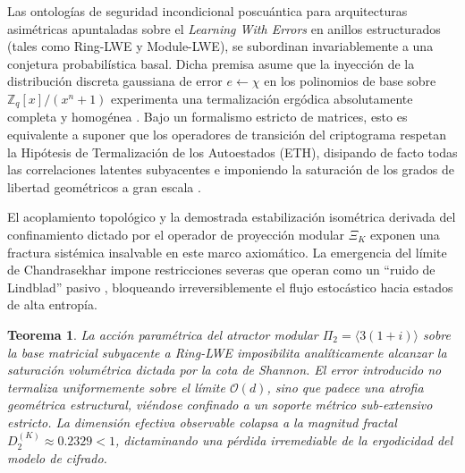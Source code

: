 \documentclass{article}
\numberwithin{equation}{section}
\theoremstyle{plain}
\newtheorem{teorema}{Teorema}[section]
\theoremstyle{definition}
\begin{document}
Las ontologías de seguridad incondicional poscuántica para arquitecturas asimétricas apuntaladas sobre el \textit{Learning With Errors} en anillos estructurados (tales como Ring-LWE y Module-LWE), se subordinan invariablemente a una conjetura probabilística basal. Dicha premisa asume que la inyección de la distribución discreta gaussiana de error $e \gets \chi$ en los polinomios de base sobre $\mathbb{Z}_q[x]/(x^n+1)$ experimenta una termalización ergódica absolutamente completa y homogénea \cite{Peikert2009, Regev2009}. Bajo un formalismo estricto de matrices, esto es equivalente a suponer que los operadores de transición del criptograma respetan la Hipótesis de Termalización de los Autoestados (ETH), disipando de facto todas las correlaciones latentes subyacentes e imponiendo la saturación de los grados de libertad geométricos a gran escala \cite{Pappalardi2023ETH}.

El acoplamiento topológico y la demostrada estabilización isométrica derivada del confinamiento dictado por el operador de proyección modular $\Xi_K$ exponen una fractura sistémica insalvable en este marco axiomático. La emergencia del límite de Chandrasekhar impone restricciones severas que operan como un ``ruido de Lindblad'' pasivo \cite{Khaymovich2021}, bloqueando irreversiblemente el flujo estocástico hacia estados de alta entropía.

\begin{teorema}
\label{teo:violacion_eth_lwe_uniqueqma}
La acción paramétrica del atractor modular $\Pi_2 = \langle 3(1+i) \rangle$ sobre la base matricial subyacente a Ring-LWE imposibilita analíticamente alcanzar la saturación volumétrica dictada por la cota de Shannon. El error introducido no termaliza uniformemente sobre el límite $\mathcal{O}(d)$, sino que padece una atrofia geométrica estructural, viéndose confinado a un soporte métrico sub-extensivo estricto. La dimensión efectiva observable colapsa a la magnitud fractal $D_2^{(K)} \approx 0.2329 < 1$, dictaminando una pérdida irremediable de la ergodicidad del modelo de cifrado.
\end{teorema}
\end{document}

